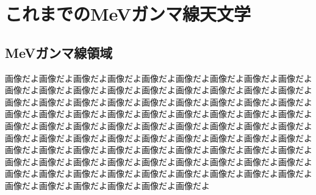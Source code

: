 \section{これまでのMeVガンマ線天文学}
\subsection{MeVガンマ線領域}

画像だよ画像だよ画像だよ画像だよ画像だよ画像だよ画像だよ画像だよ画像だよ画像だよ画像だよ画像だよ画像だよ画像だよ画像だよ画像だよ画像だよ画像だよ画像だよ画像だよ画像だよ画像だよ画像だよ画像だよ画像だよ画像だよ画像だよ画像だよ画像だよ画像だよ画像だよ画像だよ画像だよ画像だよ画像だよ画像だよ画像だよ画像だよ画像だよ画像だよ画像だよ画像だよ画像だよ画像だよ画像だよ画像だよ画像だよ画像だよ画像だよ画像だよ画像だよ画像だよ画像だよ画像だよ画像だよ画像だよ画像だよ画像だよ画像だよ画像だよ画像だよ画像だよ画像だよ画像だよ画像だよ画像だよ画像だよ画像だよ画像だよ画像だよ画像だよ画像だよ画像だよ画像だよ画像だよ画像だよ画像だよ画像だよ画像だよ画像だよ画像だよ画像だよ画像だよ画像だよ画像だよ画像だよ画像だよ
